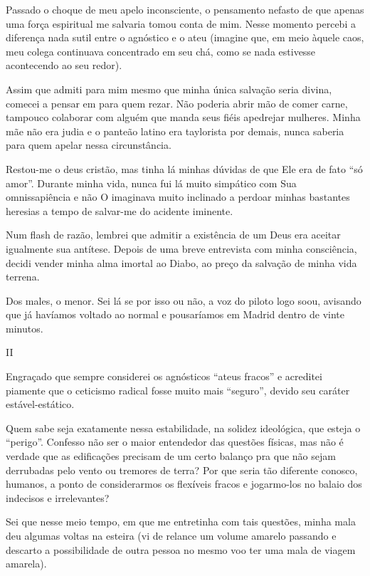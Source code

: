 Passado o choque de meu apelo inconsciente, o pensamento nefasto de que apenas uma força espiritual me salvaria tomou conta de mim. Nesse momento percebi a diferença nada sutil entre o agnóstico e o ateu (imagine que, em meio àquele caos, meu colega continuava concentrado em seu chá, como se nada estivesse acontecendo ao seu redor).

Assim que admiti para mim mesmo que minha única salvação seria divina, comecei a pensar em para quem rezar. Não poderia abrir mão de comer carne, tampouco colaborar com alguém que manda seus fiéis apedrejar mulheres. Minha mãe não era judia e o panteão latino era taylorista por demais, nunca saberia para quem apelar nessa circunstância.

Restou-me o deus cristão, mas tinha lá minhas dúvidas de que Ele era de fato ``só amor''. Durante minha vida, nunca fui lá muito simpático com Sua omnissapiência e não O imaginava muito inclinado a perdoar minhas bastantes heresias a tempo de salvar-me do acidente iminente.

Num flash de razão, lembrei que admitir a existência de um Deus era aceitar igualmente sua antítese. Depois de uma breve entrevista com minha consciência, decidi vender minha alma imortal ao Diabo, ao preço da salvação de minha vida terrena.

Dos males, o menor. Sei lá se por isso ou não, a voz do piloto logo soou, avisando que já havíamos voltado ao normal e pousaríamos em Madrid dentro de vinte minutos.

\newpage
\begin{center}
{\Large II}
\end{center}

Engraçado que sempre considerei os agnósticos ``ateus fracos'' e acreditei piamente que o ceticismo radical fosse muito mais ``seguro'', devido seu caráter estável-estático.

Quem sabe seja exatamente nessa estabilidade, na solidez ideológica, que esteja o ``perigo''. Confesso não ser o maior entendedor das questões físicas, mas não é verdade que as edificações precisam de um certo balanço pra que não sejam derrubadas pelo vento ou tremores de terra? Por que seria tão diferente conosco, humanos, a ponto de considerarmos os flexíveis fracos e jogarmo-los no balaio dos indecisos e irrelevantes?

Sei que nesse meio tempo, em que me entretinha com tais questões, minha mala deu algumas voltas na esteira (vi de relance um volume amarelo passando e descarto a possibilidade de outra pessoa no mesmo voo ter uma mala de viagem amarela).

